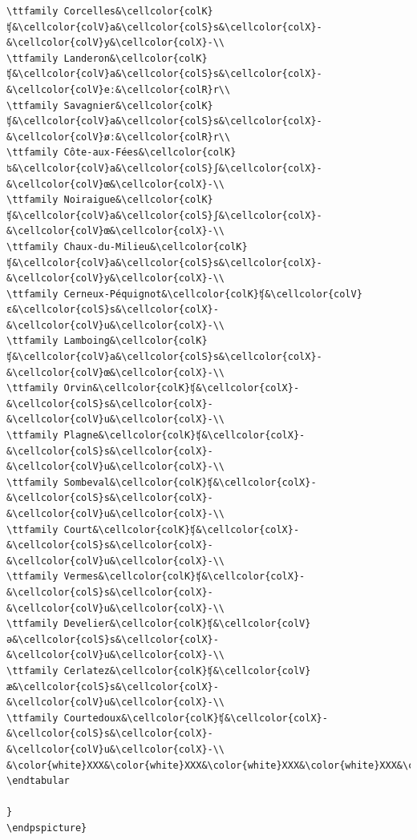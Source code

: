 \begin{verbatim}
\ttfamily Corcelles&\cellcolor{colK}ʧ&\cellcolor{colV}a&\cellcolor{colS}s&\cellcolor{colX}-&\cellcolor{colV}y&\cellcolor{colX}-\\
\ttfamily Landeron&\cellcolor{colK}ʧ&\cellcolor{colV}a&\cellcolor{colS}s&\cellcolor{colX}-&\cellcolor{colV}eː&\cellcolor{colR}r\\
\ttfamily Savagnier&\cellcolor{colK}ʧ&\cellcolor{colV}a&\cellcolor{colS}s&\cellcolor{colX}-&\cellcolor{colV}øː&\cellcolor{colR}r\\
\ttfamily Côte-aux-Fées&\cellcolor{colK}ʦ&\cellcolor{colV}a&\cellcolor{colS}ʃ&\cellcolor{colX}-&\cellcolor{colV}œ&\cellcolor{colX}-\\
\ttfamily Noiraigue&\cellcolor{colK}ʧ&\cellcolor{colV}a&\cellcolor{colS}ʃ&\cellcolor{colX}-&\cellcolor{colV}œ&\cellcolor{colX}-\\
\ttfamily Chaux-du-Milieu&\cellcolor{colK}ʧ&\cellcolor{colV}a&\cellcolor{colS}s&\cellcolor{colX}-&\cellcolor{colV}y&\cellcolor{colX}-\\
\ttfamily Cerneux-Péquignot&\cellcolor{colK}ʧ&\cellcolor{colV}ɛ&\cellcolor{colS}s&\cellcolor{colX}-&\cellcolor{colV}u&\cellcolor{colX}-\\
\ttfamily Lamboing&\cellcolor{colK}ʧ&\cellcolor{colV}a&\cellcolor{colS}s&\cellcolor{colX}-&\cellcolor{colV}œ&\cellcolor{colX}-\\
\ttfamily Orvin&\cellcolor{colK}ʧ&\cellcolor{colX}-&\cellcolor{colS}s&\cellcolor{colX}-&\cellcolor{colV}u&\cellcolor{colX}-\\
\ttfamily Plagne&\cellcolor{colK}ʧ&\cellcolor{colX}-&\cellcolor{colS}s&\cellcolor{colX}-&\cellcolor{colV}u&\cellcolor{colX}-\\
\ttfamily Sombeval&\cellcolor{colK}ʧ&\cellcolor{colX}-&\cellcolor{colS}s&\cellcolor{colX}-&\cellcolor{colV}u&\cellcolor{colX}-\\
\ttfamily Court&\cellcolor{colK}ʧ&\cellcolor{colX}-&\cellcolor{colS}s&\cellcolor{colX}-&\cellcolor{colV}u&\cellcolor{colX}-\\
\ttfamily Vermes&\cellcolor{colK}ʧ&\cellcolor{colX}-&\cellcolor{colS}s&\cellcolor{colX}-&\cellcolor{colV}u&\cellcolor{colX}-\\
\ttfamily Develier&\cellcolor{colK}ʧ&\cellcolor{colV}ə&\cellcolor{colS}s&\cellcolor{colX}-&\cellcolor{colV}u&\cellcolor{colX}-\\
\ttfamily Cerlatez&\cellcolor{colK}ʧ&\cellcolor{colV}æ&\cellcolor{colS}s&\cellcolor{colX}-&\cellcolor{colV}u&\cellcolor{colX}-\\
\ttfamily Courtedoux&\cellcolor{colK}ʧ&\cellcolor{colX}-&\cellcolor{colS}s&\cellcolor{colX}-&\cellcolor{colV}u&\cellcolor{colX}-\\
&\color{white}XXX&\color{white}XXX&\color{white}XXX&\color{white}XXX&\color{white}XXX&\color{white}XXX\\
\endtabular

}
\endpspicture}
\end{verbatim}




